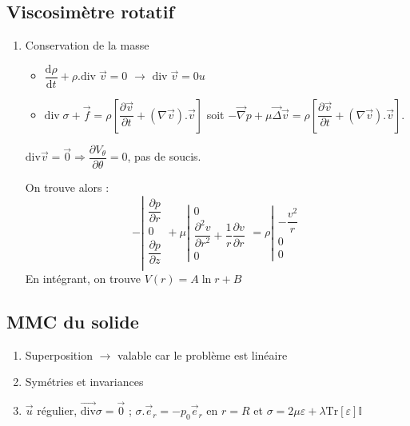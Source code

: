 \documentclass{article}
\newcommand{\deriv}{\mathrm{d}}
\begin{document}
\subsection{Viscosimètre rotatif}
\begin{enumerate}
\item Conservation de la masse
\begin{itemize}[label=$\star$]
\item $\dfrac{\deriv \rho}{\deriv t} + \rho. \text{div}\; \vec{v} = 0$ $\to$ $\text{div}\; \vec{v} = 0u$
\item $\text{div} \;\sigma+ \vec{f} = \rho\left[\dfrac{\partial \vec{v}}{\partial t} + (\nabla\vec{v}).\vec{v}\right]$ soit $-\vec{\nabla}p+\mu \vec{\Delta}\vec{v}=\rho\left[\dfrac{\partial \vec{v}}{\partial t} + (\nabla\vec{v}).\vec{v}\right]$.
\end{itemize}


$\text{div} \vec{v} = \vec{0} \Rightarrow \dfrac{\partial V_\theta}{\partial \theta} = 0$, pas de soucis.

On trouve alors :
\[
-\left|\begin{matrix}
\dfrac{\partial p}{\partial r}\\0\\\dfrac{\partial p}{\partial z}\\\end{matrix}\right.
+ \mu \left|\begin{matrix}
0\\ \dfrac{\partial^2v}{\partial r^2}+\dfrac{1}{r}\dfrac{\partial v}{\partial r} \\ 0
\end{matrix}\right. = \rho \left|\begin{matrix}
-\dfrac{v^2}{r} \\ 0 \\ 0
\end{matrix}\right.
\]
En intégrant, on trouve $V(r) = A \ln r + B$
\end{enumerate}
\subsection{MMC du solide}
\begin{enumerate}
\item Superposition $\to$ valable car le problème est linéaire

\item Symétries et invariances
\item $\vec{u}$ régulier, $\overrightarrow{\text{div}} \sigma = \vec{0}$ ; $\sigma.\vec{e}_r=-p_0\vec{e}_r$ en $r=R$ et $\sigma = 2\mu \varepsilon + \lambda \text{Tr}[\varepsilon]\mathbb{I}$
\end{enumerate}
\end{document}
